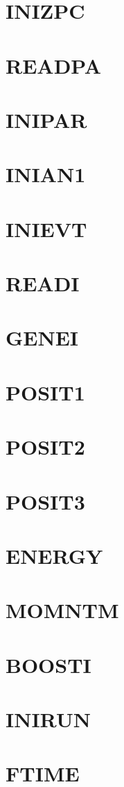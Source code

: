 \documentclass[10pt,UTF8]{ctexbook}
\begin{document}
\section{INIZPC}
\section{READPA}
\section{INIPAR}
\section{INIAN1}
\section{INIEVT}
\section{READI}
\section{GENEI}
\section{POSIT1}
\section{POSIT2}
\section{POSIT3}
\section{ENERGY}
\section{MOMNTM}
\section{BOOSTI}
\section{INIRUN}
\section{FTIME}
\end{document}
